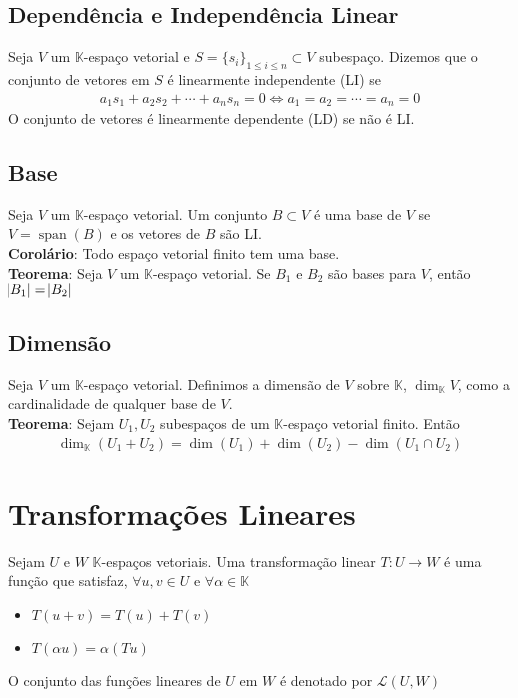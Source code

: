 \documentclass{article}
\newcommand{\K}{\mathbb{K}}
\renewcommand{\L}{\mathcal{L}}
\DeclareMathOperator{\Span}{span}
\begin{document}
\subsection{Dependência e Independência Linear}

Seja $V$ um $\K$-espaço vetorial e $S = \{s_{i}\}_{1 \leq i \leq n}  \subset  V$ subespaço. Dizemos que o conjunto de vetores em $S$ é linearmente independente (LI) se
\begin{align*}
    a_1s_1 + a_2s_2 + \cdots + a_ns_n = 0 \iff a_1 = a_2 = \cdots = a_n = 0
\end{align*}
O conjunto de vetores é linearmente dependente (LD) se não é LI.

\subsection{Base}

Seja $V$ um $\K$-espaço vetorial. Um conjunto $B \subset V$ é uma base de $V$ se $V = \Span(B)$ e os vetores de $B$ são LI. \vspace{3mm} \\
\textbf{Corolário}: Todo espaço vetorial finito tem uma base. \vspace{3mm} \\
\textbf{Teorema}: Seja $V$ um $\K$-espaço vetorial. Se $B_1$ e $B_2$ são bases para $V$, então $\abs{B_1} = \abs{B_2}$

\subsection{Dimensão}

Seja $V$ um $\K$-espaço vetorial. Definimos a dimensão de $V$ sobre $\K$, $\dim_{\K} V$, como a cardinalidade de qualquer base de $V$.  \vspace{3mm} \\
\textbf{Teorema}: Sejam $U_1, U_2$ subespaços de um $\K$-espaço vetorial finito. Então
\begin{align*}
    \dim_{\K}(U_1 + U_2) = \dim(U_1) + \dim(U_2) - \dim(U_1 \cap U_2)
\end{align*}

\newpage

\section{Transformações Lineares}

Sejam $U$ e $W$ $\K$-espaços vetoriais. Uma transformação linear $T: U \to W$ é uma função que satisfaz, $\forall u,v \in U$ e $\forall \alpha \in \K$
\begin{itemize}
    \item $T(u + v) = T(u) + T(v)$
    \item $T(\alpha u) = \alpha(Tu)$
\end{itemize}
O conjunto das funções lineares de $U$ em $W$ é denotado por $\L(U,W)$
\end{document}
